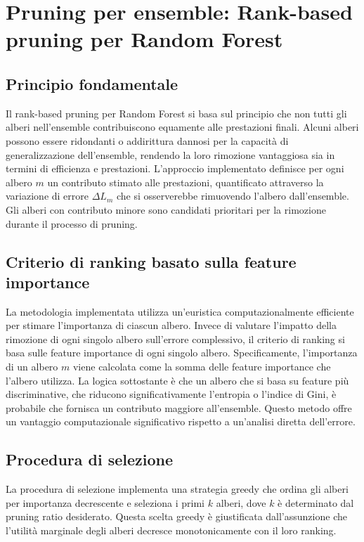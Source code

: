 \documentclass[a4paper,12pt]{report}
\begin{document}
	\section{Pruning per ensemble: Rank-based pruning per Random Forest}
	
	\subsection{Principio fondamentale}
	Il rank-based pruning per Random Forest si basa sul principio che non tutti gli alberi nell'ensemble contribuiscono equamente alle prestazioni finali. Alcuni alberi possono essere ridondanti o addirittura dannosi per la capacità di generalizzazione dell'ensemble, rendendo la loro rimozione vantaggiosa sia in termini di efficienza e prestazioni. L'approccio implementato definisce per ogni albero $m$ un contributo stimato alle prestazioni, quantificato attraverso la variazione di errore $\Delta L_m$ che si osserverebbe rimuovendo l'albero dall'ensemble. Gli alberi con contributo minore sono candidati prioritari per la rimozione durante il processo di pruning.
	
	\subsection{Criterio di ranking basato sulla feature importance}
	La metodologia implementata utilizza un'euristica computazionalmente efficiente per stimare l'importanza di ciascun albero. Invece di valutare l'impatto della rimozione di ogni singolo albero sull'errore complessivo, il criterio di ranking si basa sulle feature importance di ogni singolo albero. Specificamente, l'importanza di un albero $m$ viene calcolata come la somma delle feature importance che l'albero utilizza. La logica sottostante è che un albero che si basa su feature più discriminative, che riducono significativamente l'entropia o l'indice di Gini, è probabile che fornisca un contributo maggiore all'ensemble. Questo metodo offre un vantaggio computazionale significativo rispetto a un'analisi diretta dell'errore.
	
	\subsection{Procedura di selezione}
	La procedura di selezione implementa una strategia greedy che ordina gli alberi per importanza decrescente e seleziona i primi $k$ alberi, dove $k$ è determinato dal pruning ratio desiderato. Questa scelta greedy è giustificata dall'assunzione che l'utilità marginale degli alberi decresce monotonicamente con il loro ranking.
	
\end{document}
